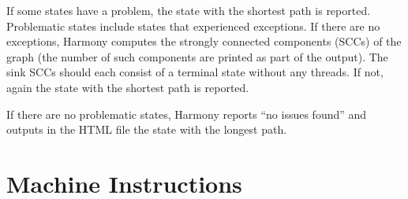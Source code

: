 \documentclass{report}
\begin{document}
If some states have a problem, the state with the shortest path is reported.
Problematic states include states that experienced exceptions.
If there are no exceptions, Harmony computes the strongly connected components (SCCs)
of the graph (the number of such components are printed as part of the output).
The sink SCCs should each consist of a terminal state without any threads.
If not, again the state with the shortest path is reported.

If there are no problematic states, Harmony reports ``no issues found'' and outputs
in the HTML file the state with the longest path.

\section{Machine Instructions}
\label{ap:harmonybytecode}
\end{document}

